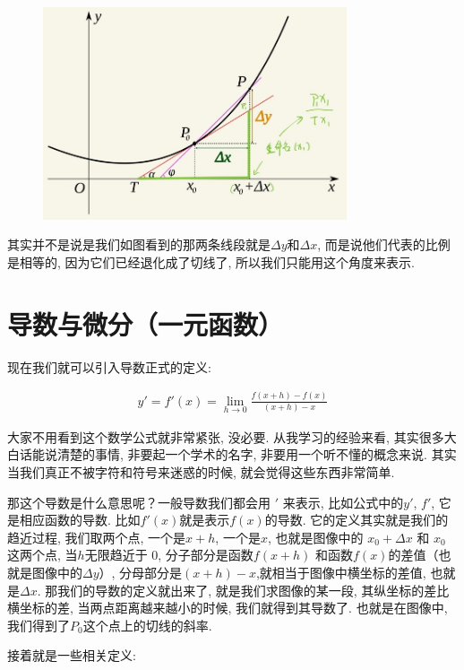 \begin{figure}[ht]
  \centering
  \includegraphics[width=0.8\textwidth]{asset/ac2df882-fb9f-4ddc-ae48-888ff4dec6a6.jpg}
  \caption{}
  \label{fig:img3_4}
\end{figure}

其实并不是说是我们如图看到的那两条线段就是$\Delta y$和$\Delta x$, 而是说他们代表的比例是相等的, 因为它们已经退化成了切线了, 所以我们只能用这个角度来表示. 

\section{导数与微分（一元函数）}

现在我们就可以引入导数正式的定义:

\begin{align*}
  y'=f'(x)=\lim_{h \to 0}\frac{f(x+h)-f(x)}{(x+h)-x}
\end{align*}

大家不用看到这个数学公式就非常紧张, 没必要. 从我学习的经验来看, 其实很多大白话能说清楚的事情, 非要起一个学术的名字, 非要用一个听不懂的概念来说. 其实当我们真正不被字符和符号来迷惑的时候, 就会觉得这些东西非常简单. 

那这个导数是什么意思呢？一般导数我们都会用 $'$ 来表示, 比如公式中的$y'$, $f'$, 它是相应函数的导数. 比如$f'(x)$就是表示$f(x)$的导数. 它的定义其实就是我们的趋近过程, 我们取两个点, 一个是$x+h$,  一个是$x$, 也就是图像中的 $x_0+\Delta x$ 和 $x_0$ 这两个点, 当$h$无限趋近于 0, 分子部分是函数$f(x+h)$ 和函数$f(x)$的差值（也就是图像中的$\Delta y$）, 分母部分是$(x+h)-x$,就相当于图像中横坐标的差值, 也就是$\Delta x$. 那我们的导数的定义就出来了, 就是我们求图像的某一段, 其纵坐标的差比横坐标的差, 当两点距离越来越小的时候, 我们就得到其导数了. 也就是在图像中, 我们得到了$P_0$这个点上的切线的斜率. 

接着就是一些相关定义:


